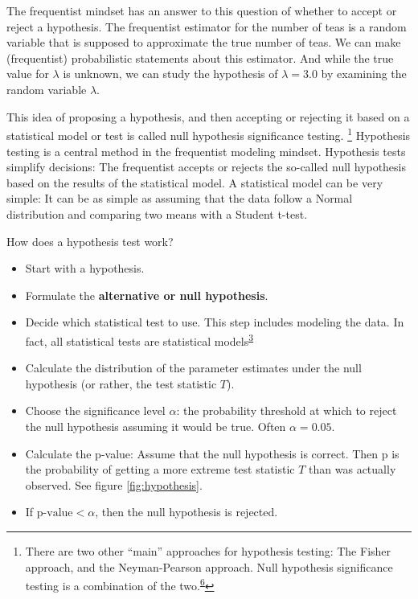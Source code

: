 \documentclass[
  10pt,
]{scrbook}
\providecommand{\tightlist}{%
  \setlength{\itemsep}{0pt}\setlength{\parskip}{0pt}}
\begin{document}
The frequentist mindset has an answer to this question of whether to accept or reject a hypothesis.
The frequentist estimator for the number of teas is a random variable that is supposed to approximate the true number of teas.
We can make (frequentist) probabilistic statements about this estimator.
And while the true value for \(\lambda\) is unknown, we can study the hypothesis of \(\lambda = 3.0\) by examining the random variable \(\hat{\lambda}\).

This idea of proposing a hypothesis, and then accepting or rejecting it based on a statistical model or test is called null hypothesis significance testing. \footnote{There are two other ``main'' approaches for hypothesis testing: The Fisher approach, and the Neyman-Pearson approach. Null hypothesis significance testing is a combination of the two.\textsuperscript{\protect\hyperlink{ref-perezgonzalez2015fisher}{6}}}
Hypothesis testing is a central method in the frequentist modeling mindset.
Hypothesis tests simplify decisions:
The frequentist accepts or rejects the so-called null hypothesis based on the results of the statistical model.
A statistical model can be very simple:
It can be as simple as assuming that the data follow a Normal distribution and comparing two means with a Student t-test.

How does a hypothesis test work?

\begin{itemize}
\tightlist
\item
  Start with a hypothesis.
\item
  Formulate the \textbf{alternative or null hypothesis}.
\item
  Decide which statistical test to use. This step includes modeling the data. In fact, all statistical tests are statistical models\textsuperscript{\protect\hyperlink{ref-mcelreath2020statistical}{3}}
\item
  Calculate the distribution of the parameter estimates under the null hypothesis (or rather, the test statistic \(T\)).
\item
  Choose the significance level \(\alpha\): the probability threshold at which to reject the null hypothesis assuming it would be true. Often \(\alpha = 0.05\).
\item
  Calculate the p-value: Assume that the null hypothesis is correct. Then p is the probability of getting a more extreme test statistic \(T\) than was actually observed. See figure \ref{fig:hypothesis}.
\item
  If \(\text{p-value} <\alpha\), then the null hypothesis is rejected.
\end{itemize}
\end{document}
